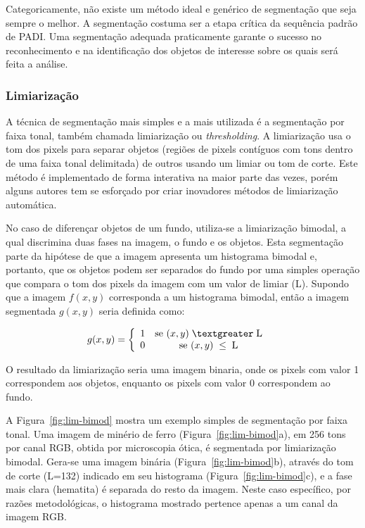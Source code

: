 Categoricamente, não existe um método ideal e genérico de segmentação
que seja sempre o melhor.\cite{52} A segmentação costuma ser a etapa
crítica da sequência padrão de PADI. Uma segmentação adequada
praticamente garante o sucesso no reconhecimento e na identificação
dos objetos de interesse sobre os quais será feita a análise.\cite{88}

\subsubsection{Limiarização}

A técnica de segmentação mais simples e a mais utilizada é a
segmentação por faixa tonal, também chamada limiarização ou
\textit{thresholding}. A limiarização usa o tom dos pixels para
separar objetos (regiões de pixels contíguos com tons dentro de uma
faixa tonal delimitada) de outros usando um limiar ou tom de
corte.\cite{72} Este método é implementado de forma interativa na
maior parte das vezes, porém alguns autores tem se esforçado por criar
inovadores métodos de limiarização automática.\cite{98,108}

No caso de diferençar objetos de um fundo, utiliza-se a limiarização
bimodal, a qual discrimina duas fases na imagem, o fundo e os
objetos. Esta segmentação parte da hipótese de que a imagem apresenta
um histograma bimodal e, portanto, que os objetos podem ser separados
do fundo por uma simples operação que compara o tom dos pixels da
imagem com um valor de limiar (L). Supondo que a imagem $f(x,y)$
corresponda a um histograma bimodal, então a imagem segmentada
$g(x,y)$ seria definida como:

\begin{align}
&g(x,y) =  \left\lbrace
	\begin{array}{c c} 
		1  
		& \text{se }(x,y) \; \textgreater \; \text{L} \\  
		0  
		& \text{se }(x,y) \; \le \; \text{L}
	\end{array}\right.
\end{align}

O resultado da limiarização seria uma imagem binaria, onde os pixels
com valor 1 correspondem aos objetos, enquanto os pixels com valor 0
correspondem ao fundo.

A Figura~\ref{fig:lim-bimod} mostra um exemplo simples de segmentação
por faixa tonal. Uma imagem de minério de ferro
(Figura~\ref{fig:lim-bimod}a), em 256 tons por canal RGB, obtida por
microscopia ótica, é segmentada por limiarização bimodal. Gera-se uma
imagem binária (Figura~\ref{fig:lim-bimod}b), através do tom de corte
(L=132) indicado em seu histograma (Figura~\ref{fig:lim-bimod}c), e a
fase mais clara (hematita) é separada do resto da imagem. Neste caso
específico, por razões metodológicas, o histograma mostrado pertence
apenas a um canal da imagem RGB.

